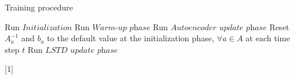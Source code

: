 \documentclass[a4paper,12pt,oneside]{article}
\numberwithin{equation}{section}
\begin{document}
    \clearpage
    \begin{algorithm}
        \caption{Training procedure}
        \begin{algorithmic}[1]
        \State Run \(Initialization\)
        \State Run \(\textit{Warm-up phase}\)
            \State Run \(\textit{Autoencoder update phase}\)
                \State Reset \(A_a^{-1}\) and \(b_a\) to the default value at the initialization phase, $\forall a \in A$ at each time step $t$
            \EndIf
            \State Run \(\textit{LSTD update phase}\)
        \EndWhile
        \end{algorithmic}[1]    
    \end{algorithm}
    
    
\end{document}
